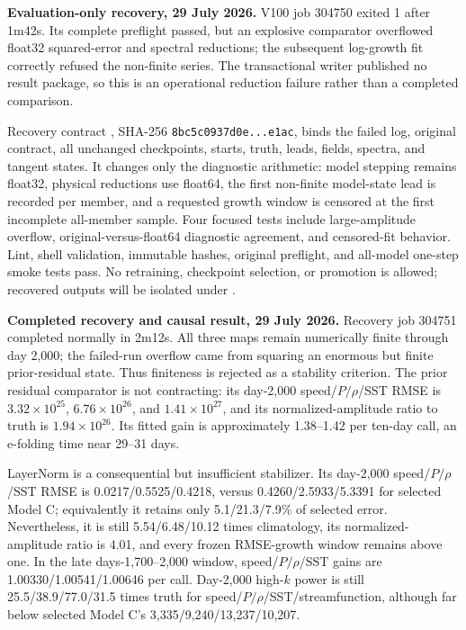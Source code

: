 \documentclass[11pt]{article}
\begin{document}
\textbf{Evaluation-only recovery, 29 July 2026.}  V100 job 304750 exited 1
after 1m42s.  Its complete preflight passed, but an explosive comparator
overflowed float32 squared-error and spectral reductions; the subsequent
log-growth fit correctly refused the non-finite series.  The transactional
writer published no result package, so this is an operational reduction
failure rather than a completed comparison.

Recovery contract
, SHA-256
\texttt{8bc5c0937d0e...e1ac}, binds the failed log, original contract, all
unchanged checkpoints, starts, truth, leads, fields, spectra, and tangent
states.  It changes only the diagnostic arithmetic: model stepping remains
float32, physical reductions use float64, the first non-finite model-state
lead is recorded per member, and a requested growth window is censored at
the first incomplete all-member sample.  Four focused tests include
large-amplitude overflow, original-versus-float64 diagnostic agreement, and
censored-fit behavior.  Lint, shell validation, immutable hashes, original
preflight, and all-model one-step smoke tests pass.  No retraining,
checkpoint selection, or promotion is allowed; recovered outputs will be
isolated under
.

\textbf{Completed recovery and causal result, 29 July 2026.}  Recovery job
304751 completed normally in 2m12s.  All three maps remain numerically finite
through day 2,000; the failed-run overflow came from squaring an enormous but
finite prior-residual state.  Thus finiteness is rejected as a stability
criterion.  The prior residual comparator is not contracting: its day-2,000
speed/\(P/\rho\)/SST RMSE is
\(3.32\times10^{25}\), \(6.76\times10^{26}\), and
\(1.41\times10^{27}\), and its normalized-amplitude ratio to truth is
\(1.94\times10^{26}\).  Its fitted gain is approximately
1.38--1.42 per ten-day call, an e-folding time near 29--31 days.

LayerNorm is a consequential but insufficient stabilizer.  Its day-2,000
speed/\(P/\rho\)/SST RMSE is 0.0217/0.5525/0.4218, versus
0.4260/2.5933/5.3391 for selected Model C; equivalently it retains only
5.1/21.3/7.9\% of selected error.  Nevertheless, it is still
5.54/6.48/10.12 times climatology, its normalized-amplitude ratio is 4.01,
and every frozen RMSE-growth window remains above one.  In the late
days-1,700--2,000 window, speed/\(P/\rho\)/SST gains are
1.00330/1.00541/1.00646 per call.  Day-2,000 high-\(k\) power is still
25.5/38.9/77.0/31.5 times truth for speed/\(P/\rho\)/SST/streamfunction,
although far below selected Model C's
3,335/9,240/13,237/10,207.
\end{document}
